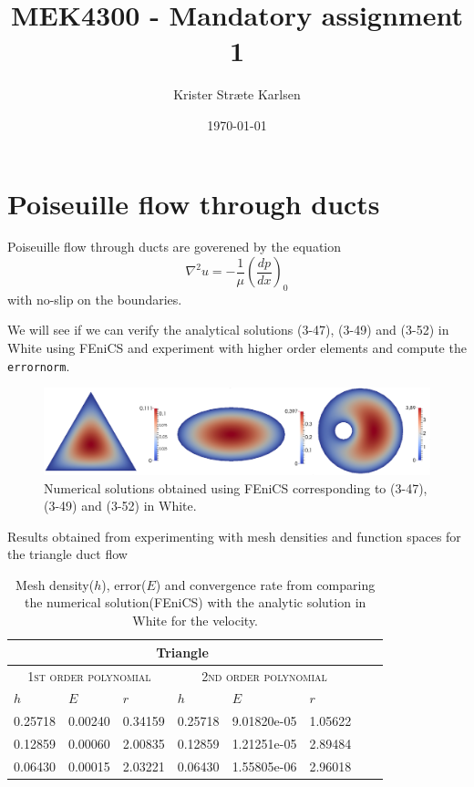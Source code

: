 \documentclass[11pt,a4paper,english]{article}
\title{MEK4300 - Mandatory assignment 1}
\author{Krister Stræte Karlsen}
\date{\today}
\numberwithin{equation}{section}
\begin{document}
\maketitle

\section{Poiseuille flow through ducts}

Poiseuille flow through ducts are goverened by the equation 
\begin{equation}
\nabla^2 u = -\frac{1}{\mu}\left( \frac{dp}{dx} \right)_0  
\end{equation}
with no-slip on the boundaries.  

We will see if we can verify the analytical solutions (3-47), (3-49) and (3-52) in White using FEniCS and experiment with higher order elements and compute the \texttt{errornorm}. 

\begin{figure}[h!] 
\begin{center}
  \includegraphics[scale=0.18]{ducts.png}
  \end{center}
  \caption{Numerical solutions obtained using FEniCS corresponding to (3-47), (3-49) and (3-52) in White.}
\end{figure}

Results obtained from experimenting with mesh densities and function spaces for the triangle duct flow

\begin{table}[H]
\centering
\caption{Mesh density($h$), error($E$) and convergence rate from comparing the numerical solution(FEniCS) with the analytic solution in White for the velocity. }
\vspace{3mm}
\begin{tabular}{|l|l|l|l|l|l|l|l|}
\hline
 \multicolumn{6}{|c|}{\textbf{Triangle}}   \\
\hline
 \multicolumn{3}{|c|}{ \textsc{1st order polynomial}} &  \multicolumn{3}{|c|}{\textsc{2nd order polynomial}}  \\
\hline
$h$ & $E$ & $r$ & $h$ & $E$ & $r$   \\
\hline
0.25718 & 0.00240 & 0.34159	& 0.25718 & 9.01820e-05 & 1.05622 \\
0.12859 & 0.00060 & 2.00835	& 0.12859 & 1.21251e-05 & 2.89484 \\
0.06430 & 0.00015 & 2.03221 & 0.06430 & 1.55805e-06 & 2.96018	\\ 
\hline
\end{tabular}
\label{tab:time}
\end{table}
\end{document}
